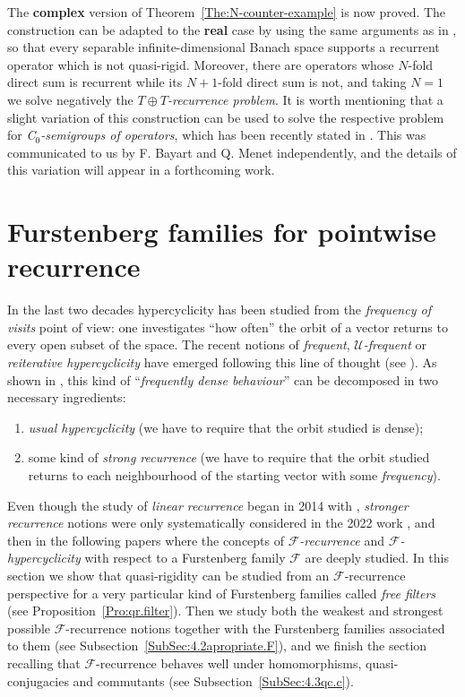 \documentclass[openright,11pt]{article}
\theoremstyle{plain}
\theoremstyle{definition}
\newcommand{\Fc}{\mathcal{F}}
\newcommand{\Uc}{\mathcal{U}}
\begin{document}
The \textbf{complex} version of Theorem~\ref{The:N-counter-example} is now proved. The construction can be adapted to the \textbf{real} case by using the same arguments as in \cite[Section~3.2]{Auge2012}, so that every separable infinite-dimensional Banach space supports a recurrent operator which is not quasi-rigid. Moreover, there are operators whose $N$-fold direct sum is recurrent while its $N+1$-fold direct sum is not, and taking $N=1$ we solve negatively the {\em $T\oplus T$-recurrence problem}. It is worth mentioning that a slight variation of this construction can be used to solve the respective problem for {\em C$_0$-semigroups of operators}, which has been recently stated in \cite{ChenKosVe2021}. This was communicated to us by F. Bayart and Q. Menet independently, and the details of this variation will appear in a forthcoming work.



\section{Furstenberg families for pointwise recurrence}\label{Sec:4F-rec}

In the last two decades hypercyclicity has been studied from the {\em frequency of visits} point of view: one investigates ``how often'' the orbit of a vector returns to every open subset of the space. The recent notions of {\em frequent}, {\em $\Uc$-frequent} or {\em reiterative hypercyclicity} have emerged following this line of thought (see \cite{BaGri2006,Shkarin2009,BMPP2016,BMPP2019}). As shown in \cite{BMPP2016,BoGrLoPe2022}, this kind of ``{\em frequently dense behaviour}'' can be decomposed in two necessary ingredients:
\begin{enumerate}[1)]
	\item {\em usual hypercyclicity} (we have to require that the orbit studied is dense);
	
	\item some kind of {\em strong recurrence} (we have to require that the orbit studied returns to each neighbourhood of the starting vector with some {\em frequency}).
\end{enumerate}
Even though the study of {\em linear recurrence} began in 2014 with \cite{CoMaPa2014}, {\em stronger recurrence} notions were only systematically considered in the 2022 work \cite{BoGrLoPe2022}, and then in the following papers \cite{GriLo2023,CarMur2022_arXiv} where the concepts of {\em $\Fc$-recurrence} and {\em $\Fc$-hypercyclicity} with respect to a Furstenberg family $\Fc$ are deeply studied. In this section we show that quasi-rigidity can be studied from an $\Fc$-recurrence perspective for a very particular kind of Furstenberg families called {\em free filters} (see Proposition~\ref{Pro:qr.filter}). Then we study both the weakest and strongest possible $\Fc$-recurrence notions together with the Furstenberg families associated to them (see Subsection~\ref{SubSec:4.2apropriate.F}), and we finish the section recalling that $\Fc$-recurrence behaves well under homomorphisms, quasi-conjugacies and commutants (see Subsection~\ref{SubSec:4.3qc.c}).\\[-5pt]
\end{document}
